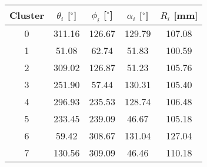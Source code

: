 \begin{tabular}{ccccc}
\hline
Cluster & $\theta_i$ [$^\circ$] & $\phi_i$ [$^\circ$] & $\alpha_i$ [$^\circ$] & $R_i$ [mm] \\
\hline
0       & 311.16                & 126.67              & 129.79                & 107.08     \\
1       & 51.08                 & 62.74               & 51.83                 & 100.59     \\
2       & 309.02                & 126.87              & 51.23                 & 105.76     \\
3       & 251.90                & 57.44               & 130.31                & 105.40     \\
4       & 296.93                & 235.53              & 128.74                & 106.48     \\
5       & 233.45                & 239.09              & 46.67                 & 105.18     \\
6       & 59.42                 & 308.67              & 131.04                & 127.04     \\
7       & 130.56                & 309.09              & 46.46                 & 110.18     \\
\hline
\end{tabular}
